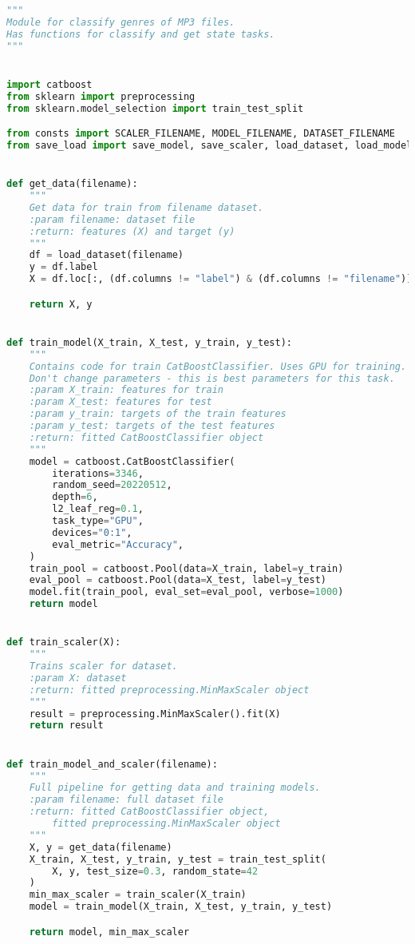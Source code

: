 \begin{lstlisting}[language=Python]
"""
Module for classify genres of MP3 files.
Has functions for classify and get state tasks.
"""


import catboost
from sklearn import preprocessing
from sklearn.model_selection import train_test_split

from consts import SCALER_FILENAME, MODEL_FILENAME, DATASET_FILENAME
from save_load import save_model, save_scaler, load_dataset, load_model


def get_data(filename):
    """
    Get data for train from filename dataset.
    :param filename: dataset file
    :return: features (X) and target (y)
    """
    df = load_dataset(filename)
    y = df.label
    X = df.loc[:, (df.columns != "label") & (df.columns != "filename")]

    return X, y


def train_model(X_train, X_test, y_train, y_test):
    """
    Contains code for train CatBoostClassifier. Uses GPU for training.
    Don't change parameters - this is best parameters for this task.
    :param X_train: features for train
    :param X_test: features for test
    :param y_train: targets of the train features
    :param y_test: targets of the test features
    :return: fitted CatBoostClassifier object
    """
    model = catboost.CatBoostClassifier(
        iterations=3346,
        random_seed=20220512,
        depth=6,
        l2_leaf_reg=0.1,
        task_type="GPU",
        devices="0:1",
        eval_metric="Accuracy",
    )
    train_pool = catboost.Pool(data=X_train, label=y_train)
    eval_pool = catboost.Pool(data=X_test, label=y_test)
    model.fit(train_pool, eval_set=eval_pool, verbose=1000)
    return model


def train_scaler(X):
    """
    Trains scaler for dataset.
    :param X: dataset
    :return: fitted preprocessing.MinMaxScaler object
    """
    result = preprocessing.MinMaxScaler().fit(X)
    return result


def train_model_and_scaler(filename):
    """
    Full pipeline for getting data and training models.
    :param filename: full dataset file
    :return: fitted CatBoostClassifier object,
        fitted preprocessing.MinMaxScaler object
    """
    X, y = get_data(filename)
    X_train, X_test, y_train, y_test = train_test_split(
        X, y, test_size=0.3, random_state=42
    )
    min_max_scaler = train_scaler(X_train)
    model = train_model(X_train, X_test, y_train, y_test)

    return model, min_max_scaler



\end{lstlisting}
